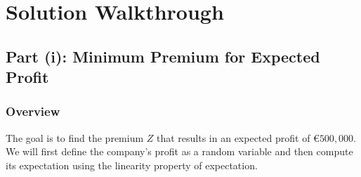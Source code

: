 \documentclass[11pt,a4paper]{article}
\begin{document}
\section{Solution Walkthrough}

\subsection{Part (i): Minimum Premium for Expected Profit}

\subsubsection{Overview}
The goal is to find the premium $Z$ that results in an expected profit of $€500,000$. We will first define the company's profit as a random variable and then compute its expectation using the linearity property of expectation.
\end{document}
